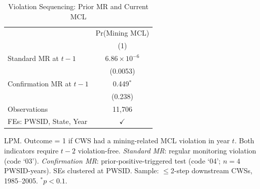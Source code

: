 
\begin{table}[htbp]
   \caption{\label{tab:strategic_seq_violations} Violation Sequencing: Prior MR and Current MCL}
   \centering
   \footnotesize
   \begin{tabular}{lc}
      \toprule
                                 & Pr(Mining MCL) \\
                                 & (1) \\
      \midrule
      Standard MR at $t-1$      & $6.86\times 10^{-6}$ \\
                                 & (0.0053) \\[4pt]
      Confirmation MR at $t-1$  & 0.449$^{*}$ \\
                                 & (0.238) \\
      \midrule
      Observations               & 11,706 \\
      FEs: PWSID, State, Year   & $\checkmark$ \\
      \bottomrule
   \end{tabular}
   \par\vspace{4pt}
   {\scriptsize\raggedright
   LPM. Outcome = 1 if CWS had a mining-related MCL violation in year $t$. Both indicators require $t-2$ violation-free. \textit{Standard MR}: regular monitoring violation (code `03'). \textit{Confirmation MR}: prior-positive-triggered test (code `04'; $n=4$ PWSID-years). SEs clustered at PWSID. Sample: $\leq$2-step downstream CWSs, 1985--2005. $^{*}p<0.1$.}
\end{table}


